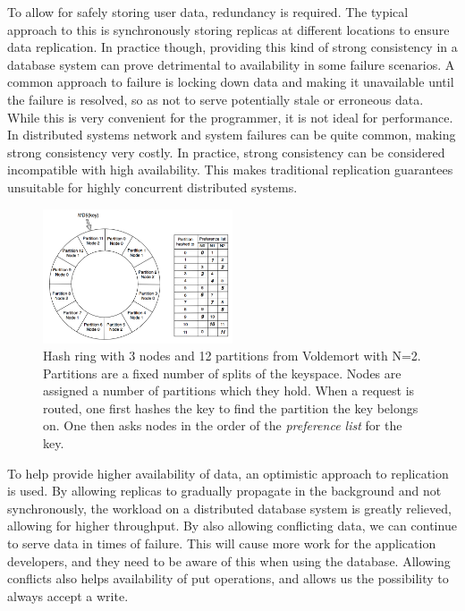 To allow for safely storing user data, redundancy is required. 
The typical approach to this is synchronously storing replicas at different locations to ensure data replication. 
In practice though, providing this kind of strong consistency in a database system can prove detrimental to availability in some failure scenarios.
A common approach to failure is locking down data and making it unavailable until the failure is resolved, so as not to serve potentially stale or erroneous data.
While this is very convenient for the programmer, it is not ideal for performance.
In distributed systems network and system failures can be quite common, making strong consistency very costly. In practice, strong consistency can be considered incompatible with high availability.
This makes traditional replication guarantees unsuitable for highly concurrent distributed systems.

\begin{figure}
    \includegraphics[width=0.5\textwidth]{introduction/hashring_voldemort}
    \caption{Hash ring with 3 nodes and 12 partitions from Voldemort\cite{dynamo} with N=2. Partitions are a fixed number of splits of the keyspace. Nodes are assigned a number of partitions which they hold. When a request is routed, one first hashes the key to find the partition the key belongs on. One then asks nodes in the order of the \emph{preference list} for the key.}
    \label{fig:voldemort_hashring}
\end{figure}

To help provide higher availability of data, an optimistic approach to replication is used.
By allowing replicas to gradually propagate in the background and not synchronously, the workload on a distributed database system is greatly relieved, allowing for higher throughput. By also allowing conflicting data, we can continue to serve data in times of failure. This will cause more work for the application developers, and they need to be aware of this when using the database. Allowing conflicts also helps availability of put operations, and allows us the possibility to always accept a write.

